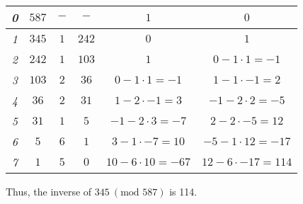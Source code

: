 {\begin{enumerate}
\begin{enumerate}[label=(\roman*)]
\begin{center}
\begin{tabular}{c|c|c|c|c|c}
                                \textit{0} & \(587\)          & \(-\)            & \(-\)         & \(1\)                     & \(0\)                      \\ \hline
                                \textit{1} & \(345\)          & \(1\)            & \(242\)       & \(0\)                     & \(1\)                      \\ \hline
                                \textit{2} & \(242\)          & \(1\)            & \(103\)       & \(1\)                     & \(0 - 1 \cdot 1 = -1\)     \\ \hline
                                \textit{3} & \(103\)          & \(2\)            & \(36\)        & \(0 - 1 \cdot 1 = -1\)    & \(1 - 1 \cdot -1 = 2\)     \\ \hline
                                \textit{4} & \(36\)           & \(2\)            & \(31\)        & \(1 - 2 \cdot -1 = 3\)    & \(-1 - 2 \cdot 2 = -5\)    \\ \hline
                                \textit{5} & \(31\)           & \(1\)            & \(5\)         & \(-1 - 2 \cdot 3 = -7\)   & \(2 - 2 \cdot -5 = 12\)    \\ \hline
                                \textit{6} & \(5\)            & \(6\)            & \(1\)         & \(3 - 1 \cdot -7 = 10\)   & \(-5 - 1 \cdot 12 = -17\)  \\ \hline
                                \textit{7} & \(1\)            & \(5\)            & \(0\)         & \(10 - 6 \cdot 10 = -67\) & \(12 - 6 \cdot -17 = 114\)
                            \end{tabular}
                        \end{center}
                        Thus, the inverse of \(345 \ (\text{mod } 587)\) is 114.


\end{enumerate}
\end{enumerate}}

